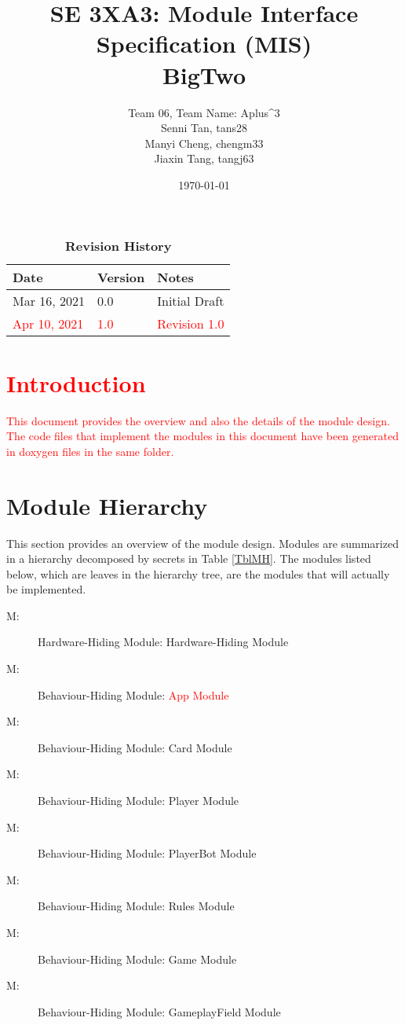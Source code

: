 \documentclass[12pt, titlepage]{article}
\title{SE 3XA3: Module Interface Specification (MIS)\\BigTwo}
\author{Team 06, Team Name: Aplus^3
		\\ Senni Tan, tans28
		\\ Manyi Cheng, chengm33
		\\ Jiaxin Tang, tangj63
}
\date{\today}
\newcounter{mnum}
\newcommand{\mthemnum}{M\themnum}
\begin{document}
\maketitle
{}
\tableofcontents
\listoftables



\begin{table}[bp]
\caption{\bf Revision History}
\begin{tabularx}{\textwidth}{p{3cm}p{2cm}X}
\toprule {\bf Date} & {\bf Version} & {\bf Notes}\\
\midrule
Mar 16, 2021 & 0.0 & Initial Draft \\
\textcolor{red}{Apr 10, 2021} & \textcolor{red}{1.0} & \textcolor{red}{Revision 1.0}\\
\bottomrule
\end{tabularx}
\end{table}
\FloatBarrier

\newpage
{}

\section{\textcolor{red}{Introduction}} \label{SecMH}
\textcolor{red}{This document provides the overview and also the details of the module design. The code files that implement the modules in this document have been generated in doxygen files in the same folder.}

\section{Module Hierarchy} \label{SecMH}

This section provides an overview of the module design. Modules are summarized
in a hierarchy decomposed by secrets in Table \ref{TblMH}. The modules listed
below, which are leaves in the hierarchy tree, are the modules that will
actually be implemented.

\begin{description}
\item [ \mthemnum \label{mHH}:] Hardware-Hiding Module: Hardware-Hiding Module
\item [ \mthemnum \label{mHH}:] Behaviour-Hiding Module: \textcolor{red}{App Module}
\item [ \mthemnum \label{mHH}:] Behaviour-Hiding Module:  Card Module
\item [ \mthemnum \label{mHH}:]
Behaviour-Hiding Module:  Player Module
\item [ \mthemnum \label{mHH}:] Behaviour-Hiding Module:  PlayerBot Module
\item [ \mthemnum \label{mHH}:] Behaviour-Hiding Module:  Rules Module
\item [ \mthemnum \label{mHH}:] Behaviour-Hiding Module: Game Module
\item [ \mthemnum \label{mHH}:] Behaviour-Hiding Module:  GameplayField Module

\end{description}
\end{document}
